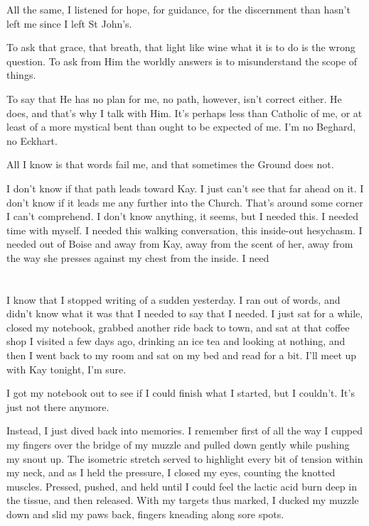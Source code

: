 All the same, I listened for hope, for guidance, for the discernment than hasn't left me since I left St John's.

To ask that grace, that breath, that light like wine what it is to do is the wrong question. To ask from Him the worldly answers is to misunderstand the scope of things.

To say that He has no plan for me, no path, however, isn't correct either. He does, and that's why I talk with Him. It's perhaps less than Catholic of me, or at least of a more mystical bent than ought to be expected of me. I'm no Beghard, no Eckhart.

All I know is that words fail me, and that sometimes the Ground does not.

I don't know if that path leads toward Kay. I just can't see that far ahead on it. I don't know if it leads me any further into the Church. That's around some corner I can't comprehend. I don't know anything, it seems, but I needed this. I needed time with myself. I needed this walking conversation, this inside-out hesychasm. I needed out of Boise and away from Kay, away from the scent of her, away from the way she presses against my chest from the inside. I need

\section{}

I know that I stopped writing of a sudden yesterday. I ran out of words, and didn't know what it was that I needed to say that I needed. I just sat for a while, closed my notebook, grabbed another ride back to town, and sat at that coffee shop I visited a few days ago, drinking an ice tea and looking at nothing, and then I went back to my room and sat on my bed and read for a bit. I'll meet up with Kay tonight, I'm sure.

I got my notebook out to see if I could finish what I started, but I couldn't. It's just not there anymore.

Instead, I just dived back into memories. I remember first of all the way I cupped my fingers over the bridge of my muzzle and pulled down gently while pushing my snout up. The isometric stretch served to highlight every bit of tension within my neck, and as I held the pressure, I closed my eyes, counting the knotted muscles. Pressed, pushed, and held until I could feel the lactic acid burn deep in the tissue, and then released. With my targets thus marked, I ducked my muzzle down and slid my paws back, fingers kneading along sore spots.


